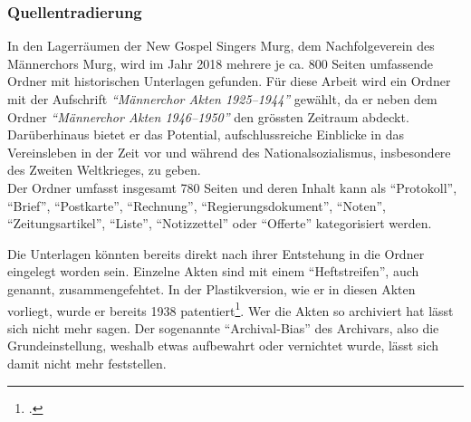 \documentclass[12pt, a4paper, ngerman, bidi=default]{article}
\let\cite\footcite
\begin{document}
\subsubsection{Quellentradierung}
In den Lagerräumen der New Gospel Singers Murg, dem Nachfolgeverein des Männerchors Murg, 
wird im Jahr 2018 mehrere je ca. 800 Seiten umfassende Ordner mit historischen Unterlagen gefunden. 
Für diese Arbeit wird ein Ordner mit der Aufschrift \textit{\enquote{Männerchor Akten 1925--1944}} gewählt, da er neben dem Ordner 
\textit{\enquote{Männerchor Akten 1946--1950}} den grössten Zeitraum abdeckt. Darüberhinaus bietet er das Potential, 
aufschlussreiche Einblicke in das Vereinsleben in der Zeit vor und während des Nationalsozialismus, insbesondere des Zweiten Weltkrieges, zu geben.\\ 
Der Ordner umfasst insgesamt 780 Seiten und deren Inhalt kann als \enquote{Protokoll}, \enquote{Brief}, \enquote{Postkarte}, \enquote{Rechnung}, 
\enquote{Regierungsdokument}, \enquote{Noten}, \enquote{Zeitungsartikel}, \enquote{Liste}, \enquote{Notizzettel} oder \enquote{Offerte} kategorisiert werden.

Die Unterlagen könnten bereits direkt nach ihrer Entstehung in die Ordner eingelegt worden sein. Einzelne Akten sind mit einem 
\enquote{Heftstreifen}, auch  genannt, zusammengefehtet. In der Plastikversion, wie er in diesen Akten vorliegt, wurde er bereits 1938 patentiert\cite[vgl.][]{noauthor_heftstreifen_2023}.
Wer die Akten so archiviert hat lässt sich nicht mehr sagen. 
Der sogenannte \enquote{Archival-Bias} des Archivars, also die Grundeinstellung, weshalb etwas aufbewahrt oder
vernichtet wurde, lässt sich damit nicht mehr feststellen. 
\end{document}
